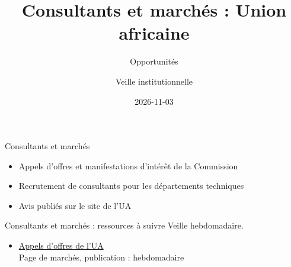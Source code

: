 \documentclass[aspectratio=169,11pt]{beamer}
\title{Consultants et marchés : Union africaine}
\subtitle{Opportunités}
\author{Veille institutionnelle}
\date{2026-11-03}
\begin{document}
\begin{frame}\titlepage\end{frame}

\begin{frame}{Consultants et marchés}
\begin{itemize}
\item Appels d'offres et manifestations d'intérêt de la Commission
\item Recrutement de consultants pour les départements techniques
\item Avis publiés sur le site de l'UA
\end{itemize}
\end{frame}

\begin{frame}{Consultants et marchés : ressources à suivre}
\small
Veille hebdomadaire.
\begin{itemize}
\item \href{https://au.int/en/bids}{Appels d'offres de l'UA}\\{\footnotesize Page de marchés, publication : hebdomadaire}
\end{itemize}
\end{frame}
\end{document}
